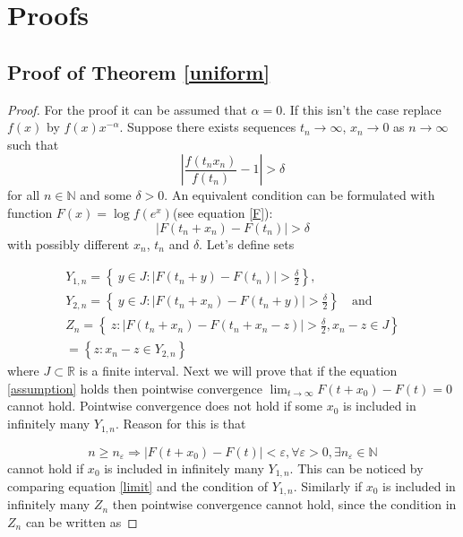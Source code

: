 \documentclass[english,12pt,a4paper,pdftex,sci,utf8]{aaltothesis} %
\begin{document}
\clearpage

\thesisappendix
{}

\section{Proofs}
\label{proofs}
\subsection{Proof of Theorem \ref{uniform}}

\begin{proof}
For the proof it can be assumed that $\alpha=0$. If this isn't the case replace $f(x)$ by $f(x)x^{-\alpha}$. Suppose there exists sequences $t_n \rightarrow \infty$, $x_n \rightarrow 0$ as $n \rightarrow \infty$ such that
\begin{equation*}
\left| \frac{f(t_nx_n)}{f(t_n)} - 1 \right| > \delta
\end{equation*}
for all $n \in \mathbb{N}$ and some $\delta>0$. An equivalent condition can be formulated with function $F(x) = \log f(e^x)$(see equation \ref{F}):
\begin{equation}
\left| F(t_n+x_n) - F(t_n) \right| > \delta
\label{assumption}
\end{equation}
with possibly different $x_n$, $t_n$ and $\delta$. Let's define sets

\begin{align*}
Y_{1,n} = \left\{ \ y \in J: \left| F(t_n+y)-F(t_n) \right| > \frac{\delta}{2} \right\}, \\
Y_{2,n} = \left\{ \ y \in J: \left| F(t_n+x_n)-F(t_n+y) \right| > \frac{\delta}{2} \right\} \quad  \textrm{and} \\
Z_n = \left\{ \ z: \left| F(t_n+x_n)-F(t_n+x_n-z) \right| > \frac{\delta}{2}, x_n-z \in J \right\} \\
= \left\{ z: x_n-z \in Y_{2,n} \right\}
\end{align*}
where $J \subset \mathbb{R}$ is a finite interval. Next we will prove that if the equation \ref{assumption} holds then pointwise convergence $\lim_{t \rightarrow \infty}F(t+x_0)-F(t)=0$ cannot hold. Pointwise convergence does not hold if some $x_0$ is included in infinitely many $Y_{1,n}$. Reason for this is that

\begin{equation}
n \geq n_{\varepsilon} \Rightarrow \left| F(t+x_0) - F(t) \right| < \varepsilon, \forall \varepsilon>0, \exists n_{\varepsilon} \in \mathbb{N}
\label{limit}
\end{equation}
cannot hold if $x_0$ is included in infinitely many $Y_{1,n}$. This can be noticed by comparing equation \ref{limit} and the condition of $Y_{1,n}$. Similarly if $x_0$ is included in infinitely many $Z_n$ then pointwise convergence cannot hold, since the condition in $Z_{n}$ can be written as


\end{proof}
\end{document}
